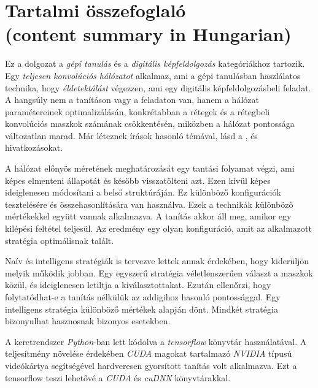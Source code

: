 \documentclass[12pt]{report}
\begin{document}
\begingroup
	\hypersetup{hidelinks}
	\tableofcontents
\endgroup


\chapter*{Tartalmi összefoglaló\\(content summary in Hungarian)}

Ez a dolgozat a \textit{gépi tanulás} és a \textit{digitális képfeldolgozás} kategóriákhoz tartozik. Egy \textit{teljesen konvolúciós hálózatot} alkalmaz, ami a gépi tanulásban haszlálatos technika, hogy \textit{éldetektálást} végezzen, ami egy digitális képfeldolgozásbeli feladat. A hangsúly nem a tanításon vagy a feladaton van, hanem a hálózat paramétereinek optimalizálásán, konkrétabban a rétegek és a rétegbeli konvolúciós maszkok számának csökkentésén, miközben a hálózat pontossága változatlan marad. Már léteznek írások hasonló témával, lásd a \cite{pruning_web}, \cite{pruning_arxiv} és \cite{understanding} hivatkozásokat.

A hálózat előnyös méretének meghatározását egy tantási folyamat végzi, ami képes elmenteni állapotát és később visszatölteni azt. Ezen kívül képes ideiglenesen módosítani a belső struktúráján. Ez különböző konfigurációk tesztelésére és összehasonlítására van használva. Ezek a technikák különböző mértékekkel együtt vannak alkalmazva. A tanítás akkor áll meg, amikor egy kilépési feltétel teljesül. Az eredmény egy olyan konfiguráció, amit az alkalmazott stratégia optimálisnak talált.

Naív és intelligens stratégiák is tervezve lettek annak érdekében, hogy kiderüljön melyik működik jobban. Egy egyszerű stratégia véletlenszerűen választ a maszkok közül, és ideiglenesen letiltja a kiválasztottakat. Ezután ellenőrzi, hogy folytatódhat-e a tanítás nélkülük az addigihoz hasonló pontossággal. Egy intelligens stratégia különböző mértékek alapján dönt. Mindkét stratégia bizonyulhat hasznosnak bizonyos esetekben.

A keretrendszer \textit{Python}-ban lett kódolva a \textit{tensorflow} könyvtár \cite{tensorflow2015-whitepaper} használatával. A teljesítmény növelése érdekében \textit{CUDA} magokat tartalmazó \textit{NVIDIA} típusú videókártya segítségével hardveresen gyorsított tanítás volt alkalmazva. Ezt a tensorflow teszi lehetővé a \textit{CUDA} és \textit{cuDNN} könyvtárakkal.
\end{document}
